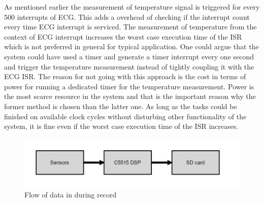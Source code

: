  As mentioned earlier the measurement of temperature signal is triggered for every 500 interrupts of ECG. This adds a overhead of checking if the interrupt count every time ECG interrupt is serviced. The measurement of temperature from the context of ECG interrupt increases the worst case execution time of the ISR which is not preferred in general for typical application. One could argue that the system could have used a timer and generate a timer interrupt every one second and trigger the temperature measurement instead of tightly coupling it with the ECG ISR. The reason for not going with this approach is the cost in terms of power for running a dedicated timer for the temperature measurement. Power is the most scarce resource in the system and that is the important reason why the former method is chosen than the latter one. As long as the tasks could be finished on available clock cycles without disturbing other functionality of the system, it is fine even if the worst case execution time of the ISR increases.
 \begin{figure}[h]
 	\centering
 	\includegraphics[scale = 0.5 ]{record_dataflow.JPG}
 	\caption{Flow of data in during record\label{record_datalow}}
 \end{figure}

